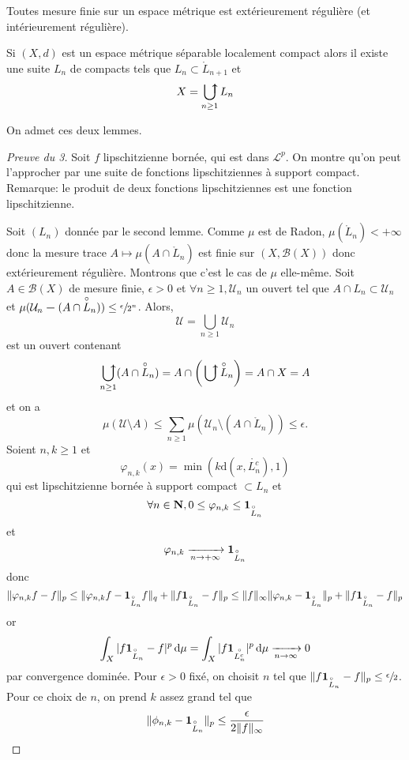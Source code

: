 \begin{lmm}
    Toutes mesure finie sur un espace métrique est extérieurement régulière (et intérieurement régulière).
\end{lmm}

\begin{lmm}
    Si $(X, d)$ est un espace métrique séparable localement compact alors il existe une suite  $L_n$ de compacts tels que  $L_n\subset \mathring L_{n+1}$ et \[
    X=\ubigcup_{n\geq 1}L_n
    \]
\end{lmm}

On admet ces deux lemmes.

\begin{proof}[Preuve du 3]
Soit $f$ lipschitzienne bornée, qui est dans  $\mathcal  L^p$. On montre qu'on peut l'approcher par une suite de fonctions lipschitziennes à support compact. Remarque: le produit de deux fonctions lipschitziennes est une fonction lipschitzienne.

Soit $(L_n)$ donnée par le second lemme. Comme  $\mu$ est de Radon,  $\mu(\mathring L_n)<+\infty$ donc la mesure trace $A\longmapsto \mu\left(A\cap \mathring L_n\right)$ est finie sur $(X, \mathcal  B(X))$ donc extérieurement régulière. Montrons que c'est le cas de $\mu$ elle-même. Soit  $A \in  \mathcal  B(X)$ de mesure finie, $ \epsilon>0$ et $\forall  n \geq 1, \mathcal  U_n$ un ouvert tel que $A\cap L_n\subset \mathcal  U_n$ et $\mu(\mathcal  U_n\bm-  (A\cap \overset\circ{L}_n))\leq \sfrac{\epsilon}{2^n}$. Alors, \[
\mathcal  U=\bigcup_{n\geq 1}\mathcal  U_n
\] 
est un ouvert contenant \[
    \ubigcup_{n\geq 1}(A\cap \mathring L_{n})=A\cap\left(\ubigcup \mathring L_n\right)=A\cap X=A
\]
et on a \[
    \mu(\mathcal  U \setminus  A)\leq \sum_{n\geq 1} \mu(\mathcal  U_n \setminus  (A \cap \mathring L_n))\leq \epsilon.
\]
Soient $n, k\geq 1$ et \[
    \varphi_{n, k}(x)=\min(k\mathrm d(x, \mathring {L_n^c}), 1)
\] 
qui est lipschitzienne bornée à support compact $\subset L_n$ et \[
    \forall  n \in  \mathbf N, 0\leq \varphi_{n, k}\leq \bm{1}_{\overset\circ{L}_n}
\] 
et \[
    \varphi_{n, k} \xrightarrow[n\to+\infty]{}\bm{1}_{\overset\circ{L}_n}
\] 
donc \[
\|{\varphi_{n,k}f}-f\|_p \leq \| \varphi_{n,k}f- \bm{1}_{\overset\circ{L}_n}f\|_q+ \| f\bm{1}_{\overset\circ{L}_n}-f\|_p\leq \|f\|_{\infty}\|\varphi_{n,k}-\bm{1}_{\overset\circ{L}_n}\|_{p} + \|f\bm{1}_{\overset\circ{L}_n}-f\|_p
\]
or \[
    \int_X |f\bm{1}_{\overset\circ{L}_n}-f|^p\mathop{}\!\mathrm d\mu = \int_X |f\bm{1}_{\overset\circ{L_n^c}}|^p\mathop{}\!\mathrm d\mu \xrightarrow[n\to\infty]{} 0
\]
par convergence dominée. Pour $ \epsilon>0$ fixé, on choisit $n$ tel que  $\|f\bm{1}_{\overset\circ{L}_n}-f\|_p\leq \sfrac\epsilon2$. Pour ce choix de $n$, on prend  $k$ assez grand tel que  \[
\|\phi_{n,k}-\bm{1}_{\overset\circ{L}_n}\|_p \leq \frac{\epsilon}{2\|f\|_{\infty}}
\] 
\end{proof}

